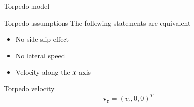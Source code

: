 \documentclass{beamer}
\begin{document}
        \begin{frame}{Torpedo model}
            \centering
            \begin{minipage}{0.7\textwidth}
                \begin{block}{Torpedo assumptions}
                    The following statements are equivalent
                    \begin{itemize}
                        \item No side slip effect \\
                        \item No lateral speed
                        \item Velocity along the $\mathnormal{x}$ axis \\
                    \end{itemize}
                \end{block}
                \begin{block}{Torpedo velocity}
                    \begin{equation}
                        \mathbf{v_r} = (v_r, 0, 0)^T
                    \end{equation}
                \end{block}
            \end{minipage}
        \end{frame}
\end{document}

